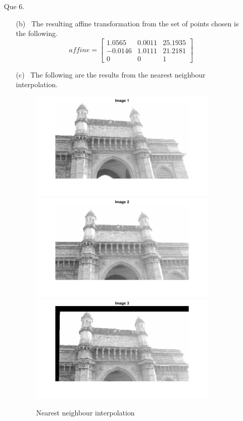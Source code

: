 \documentclass[11pt]{article}
\begin{document}
\maketitle
\begin{enumerate}
\item[Que 6.]
\begin{enumerate}

\item[(b)] \
The resulting affine transformation from the set of points chosen is the following.
\begin{equation}
    \textit{affine}=\begin{bmatrix}
        1.0565 & 0.0011 & 25.1935\\
-0.0146 & 1.0111 & 21.2181\\
0 & 0 & 1
    \end{bmatrix}
\end{equation}
\item[(c)] \
The following are the results from the nearest neighbour interpolation.
\begin{figure}[!htb]
\centering
{}
  \includegraphics[width=9cm]{../images/Im1.jpg}
  \endminipage\hfill
 \includegraphics[width=9cm]{../images/Im2.jpg}
    \endminipage\hfill
  \minipage{0.5\textwidth}
  \includegraphics[width=9cm]{../images/nearest.jpg}
  \endminipage\hfill
\caption{Nearest neighbour interpolation}
\end{figure}


\end{enumerate}
\end{enumerate}
\end{document}
